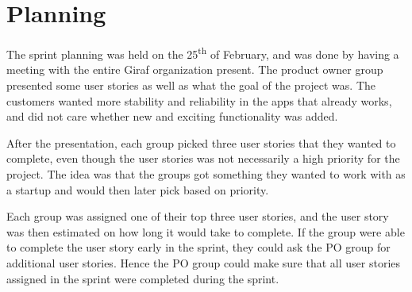 \section{Planning}
The sprint planning was held on the 25\textsuperscript{th} of February, and was done by having a meeting with the entire Giraf organization present. 
The product owner group presented some user stories as well as what the goal of the project was. 
The customers wanted more stability and reliability in the apps that already works, and did not care whether new and exciting functionality was added. 

After the presentation, each group picked three user stories that they wanted to complete, even though the user stories was not necessarily a high priority for the project. 
The idea was that the groups got something they wanted to work with as a startup and would then later pick based on priority.

Each group was assigned one of their top three user stories, and the user story was then estimated on how long it would take to complete.
If the group were able to complete the user story early in the sprint, they could ask the PO group for additional user stories.
Hence the PO group could make sure that all user stories assigned in the sprint were completed during the sprint.

 
